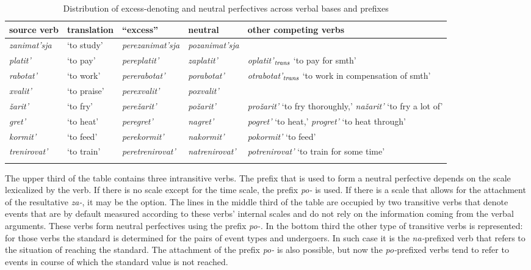 \begin{sidewaystable}
\caption{Distribution of excess-denoting and neutral perfectives across verbal bases and prefixes \label{table:competition}}
\begin{tabularx}{\textwidth}{l  l  l  l  Q}
\lsptoprule
source verb& translation & ``excess'' & neutral & other competing verbs\\ \midrule
\textit{zanimat'sja} & `to study' & \textit{perezanimat'sja} & \textit{pozanimat'sja} & \\
\textit{platit'} & `to pay' & \textit{pereplatit'} & \textit{zaplatit'} & \textit{oplatit'$_{\mathit{trans}}$} `to pay for smth'\\
\textit{rabotat'} & `to work' & \textit{pererabotat'} & \textit{porabotat'} & \textit{otrabotat'$_{\mathit{trans}}$} `to work in compensation of smth'\\

\tablevspace
\textit{xvalit'} & `to praise' & \textit{perexvalit'} & \textit{poxvalit'} &\\
\textit{\v{z}arit'} & `to fry' & \textit{pere\v{z}arit'} & \textit{po\v{z}arit'} & \textit{pro\v{z}arit'} `to fry thoroughly,' \textit{na\v{z}arit'} `to fry a lot of'\\ 

\tablevspace
\textit{gret'} & `to heat' & \textit{peregret'} & \textit{nagret'} & \textit{pogret'} `to heat,' \textit{progret'} `to heat through'\\ 
\textit{kormit'} & `to feed' & \textit{perekormit'} & \textit{nakormit'} & \textit{pokormit'} `to feed'\\
\textit{trenirovat'} & `to train' & \textit{peretrenirovat'} & \textit{natrenirovat'} & \textit{potrenirovat'} `to train for some time'\\\lspbottomrule
\end{tabularx}
\end{sidewaystable}

The upper third of the table contains three intransitive verbs. The prefix that is used to form a neutral perfective depends on the scale lexicalized by the verb. If there is no scale except for the time scale, the prefix \textit{po-} is used. If there is a scale that allows for the attachment of the resultative \textit{za-}, it may be the option. The lines in the middle third of the table are occupied by two transitive verbs that denote events that are by default measured according to these verbs' internal scales and do not rely on the information coming from the verbal arguments. These verbs form neutral perfectives using the prefix \textit{po-.} In the bottom third the other type of transitive verbs is represented: for those verbs the standard is determined for the pairs of event types and undergoers. In such case it is the \textit{na-}prefixed verb that refers to the situation of reaching the standard. The attachment of the prefix \textit{po-} is also possible, but now the \textit{po-}prefixed verbs tend to refer to events in course of which the standard value is not reached.

